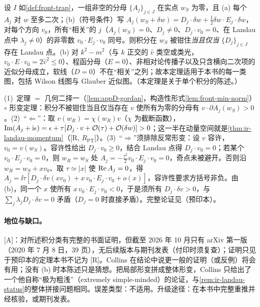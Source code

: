 \begin{theorem}\label{thm:front-collins-pinch}
设 $I$ 如\cref{def:front-trap}，一组非空的分母 $\{A_j\}_{j\in J}$ 在实点 $w_S$ 为零，且 (a) 每个 $A_j$ 对 $w$ 至多二次；(b)（符号条件）写 $A_j(w_S+\delta w)=D_j\cdot\delta w+\frac12\delta w\cdot E_j\cdot\delta w$，对每个方向 $v_0$，所有“相关”的 $j$（$A_j(w_S)=0$、$D_j\ne0$、$D_j\cdot v_0=0$、在 Landau 点中 $\lambda_j\ne0$）的非零数 $v_0\cdot E_j\cdot v_0$ 同号。则积分在 $w_S$ 被钳住\emph{当且仅当} $\{D_j\}_{j\in J}$ 存在 Landau 点。(b) 对 $k^2-m^2$（与 $k$ 正交的 $\hat v$ 类空或类光，$v_0\cdot E\cdot v_0=2\hat v^2\le0$）、程函分母（$E=0$）、非相对论传播子以及只含横向二次项的近似分母成立，软线（$D=0$）不在“相关”之列；故本定理适用于本书的每一类图，包括 Wilson 线图与 Glauber 近似图。（本定理是关于单个积分的陈述。）
\end{theorem}

\begin{proofsketch}
(1)~定理 $=$ 几何二择一（\cref{lem:appD-gordan}，构造性形式\cref{lem:front-min-norm}）$\circ$ 形变定理：积分不被钳住当且仅当存在 $v$ 使所有为零的分母有 $v\cdot\partial A_j(w_S)>0$\cite[定理~2]{Collins:2020euz}。(2)~“$\Leftarrow$”：取 $v(w_R)=\chi(w_R)v$（$\chi$ 为截断函数），$\operatorname{Im}(A_j+\mathrm{i}\epsilon)=\epsilon+\tau[D_j\cdot v+\mathcal{O}\!\left(\tau\right)+\mathcal{O}\!\left(\delta w\right)]>0$\cite[式~(8.1)]{Collins:2020euz}；这一半在动量空间就是\cref{thm:ir-landau-momentum}（[R, $R_{\mathrm{PT}}$]）。(3)~“$\Rightarrow$”须排除反常形变：设 $v$ 容许，$v_0=v(w_S)$。容许性给出 $D_j\cdot v_0\ge0$，结合 Landau 点得 $D_j\cdot v_0=0$；若某个 $v_0\cdot E_j\cdot v_0=0$，则 $w_R=w_S$ 处 $A_j=-\frac{\tau^2}2v_0\cdot E_j\cdot v_0=0$，奇点未被避开。否则沿 $w_R=w_S+xv_0$、取 $\tau\simeq|x|$ 使 $\operatorname{Re} A_j=0$，得 $A_j=\ii\tau[D_j\cdot\delta v(xv_0)+x\,v_0\cdot E_j\cdot v_0+o(x)]$\cite[式~(8.13)--(8.14)]{Collins:2020euz}，容许性要求方括号非负。由 (b)，同一个 $x$ 使所有 $x\,v_0\cdot E_j\cdot v_0<0$，于是须所有 $D_j\cdot\delta v>0$，与 $\sum_j\lambda_jD_j\cdot\delta v=0$ 矛盾（$D_j=0$ 时直接矛盾）。完整论证见\cite[第~V--VIII~节]{Collins:2020euz}（预印本）。
\end{proofsketch}

\paragraph{地位与缺口。}[A]：对所述积分类有完整的书面证明，但截至 2026 年 10 月\cite{Collins:2020euz}只有 arXiv 第一版（2020 年 7 月 8 日，39 页），无后续版本与期刊发表（付印时须复查）；证明只见于预印本的定理本书不记为 [R]。Collins 在结论中说更一般的证明（或反例）将会有用；没有 (b) 时本陈述只是猜想。把局部形变拼成整体形变，Collins 只给出了一个他自称“极为粗浅”（extremely simple-minded）的论证\cite[第~VIII.D~节]{Collins:2020euz}，与\cref{rem:ir-landau-status}的整体拼接问题相同。误差类型：不适用。升级途径：在本书中完整重推并经核验，或期刊发表。

